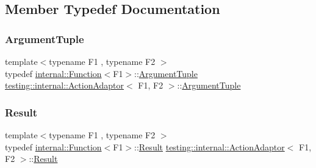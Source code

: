\subsection{Member Typedef Documentation}
\mbox{\label{classtesting_1_1internal_1_1ActionAdaptor_a4f78fb73f97b72fea8a93b78a8ab5704}} 
\subsubsection{\texorpdfstring{ArgumentTuple}{ArgumentTuple}}
{\footnotesize\ttfamily template$<$typename F1 , typename F2 $>$ \\
typedef \mbox{\hyperlink{structtesting_1_1internal_1_1Function}{internal\+::\+Function}}$<$F1$>$\+::\mbox{\hyperlink{classtesting_1_1internal_1_1ActionAdaptor_a4f78fb73f97b72fea8a93b78a8ab5704}{Argument\+Tuple}} \mbox{\hyperlink{classtesting_1_1internal_1_1ActionAdaptor}{testing\+::internal\+::\+Action\+Adaptor}}$<$ F1, F2 $>$\+::\mbox{\hyperlink{classtesting_1_1internal_1_1ActionAdaptor_a4f78fb73f97b72fea8a93b78a8ab5704}{Argument\+Tuple}}}

\mbox{\label{classtesting_1_1internal_1_1ActionAdaptor_afa8f7872b6db3d8f1545fd98b45b0b95}} 
\subsubsection{\texorpdfstring{Result}{Result}}
{\footnotesize\ttfamily template$<$typename F1 , typename F2 $>$ \\
typedef \mbox{\hyperlink{structtesting_1_1internal_1_1Function}{internal\+::\+Function}}$<$F1$>$\+::\mbox{\hyperlink{classtesting_1_1internal_1_1ActionAdaptor_afa8f7872b6db3d8f1545fd98b45b0b95}{Result}} \mbox{\hyperlink{classtesting_1_1internal_1_1ActionAdaptor}{testing\+::internal\+::\+Action\+Adaptor}}$<$ F1, F2 $>$\+::\mbox{\hyperlink{classtesting_1_1internal_1_1ActionAdaptor_afa8f7872b6db3d8f1545fd98b45b0b95}{Result}}}



